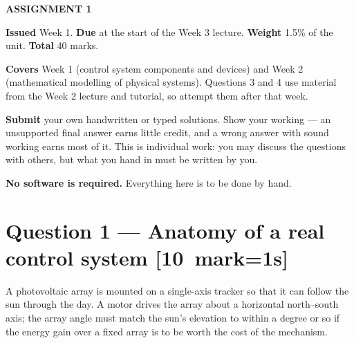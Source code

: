 \documentclass[11pt,a4paper]{article}
\newif\ifscheme
\newcommand{\qmarks}[1]{\hfill\mbox{\small\color{fnavy}\textbf{[#1 mark\ifnum#1=1\else s\fi]}}}
\begin{document}
\weektitle

\begin{center}
\ifscheme
  {\large\sffamily\bfseries\color{fflag}MARKING SCHEME}\\[2pt]
  {\small\itshape Instructor copy. Not for circulation.}
\else
  {\large\sffamily\bfseries\color{fnavy}ASSIGNMENT 1}
\fi
\end{center}

\bigskip
\begin{readingbox}
\textbf{Issued} Week 1. \qquad
\textbf{Due} at the start of the Week 3 lecture. \qquad
\textbf{Weight} 1.5\% of the unit. \qquad
\textbf{Total} 40 marks.

\smallskip
\textbf{Covers} Week 1 (control system components and devices) and Week 2
(mathematical modelling of physical systems). Questions 3 and 4 use material
from the Week 2 lecture and tutorial, so attempt them after that week.

\smallskip
\textbf{Submit} your own handwritten or typed solutions. Show your working ---
an unsupported final answer earns little credit, and a wrong answer with sound
working earns most of it. This is individual work: you may discuss the
questions with others, but what you hand in must be written by you.

\smallskip
\textbf{No software is required.} Everything here is to be done by hand.
\end{readingbox}

\section*{Question 1 --- Anatomy of a real control system \qmarks{10}}

A photovoltaic array is mounted on a single-axis tracker so that it can follow
the sun through the day. A motor drives the array about a horizontal
north--south axis; the array angle must match the sun's elevation to within a
degree or so if the energy gain over a fixed array is to be worth the cost of
the mechanism.
\end{document}
